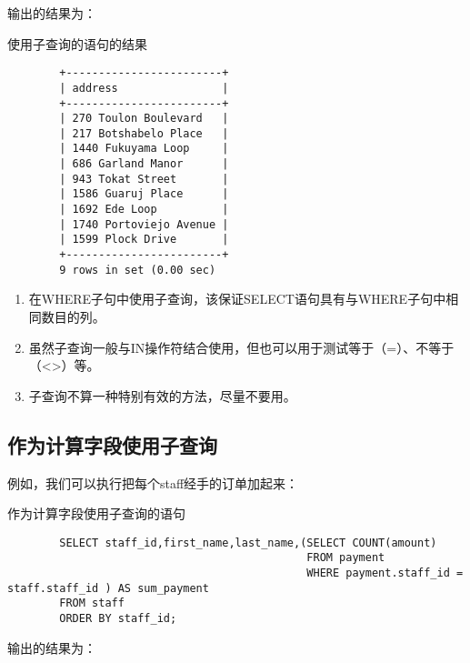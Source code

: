 \documentclass[UTF8]{article}
\begin{document}
输出的结果为：

\begin{listing}[H]
	\caption{使用子查询的语句的结果}
	\label{code:usesubqueryclauseresult}
\begin{verbatim}
        +------------------------+
        | address                |
        +------------------------+
        | 270 Toulon Boulevard   |
        | 217 Botshabelo Place   |
        | 1440 Fukuyama Loop     |
        | 686 Garland Manor      |
        | 943 Tokat Street       |
        | 1586 Guaruj Place      |
        | 1692 Ede Loop          |
        | 1740 Portoviejo Avenue |
        | 1599 Plock Drive       |
        +------------------------+
        9 rows in set (0.00 sec)
\end{verbatim}
\end{listing}

\begin{orangebox}[frametitle={Tips 14.1.1 子查询注意事项}]
        \begin{enumerate}
                \item 在WHERE子句中使用子查询，该保证SELECT语句具有与WHERE子句中相同数目的列。
                \item 虽然子查询一般与IN操作符结合使用，但也可以用于测试等于（=）、不等于（<>）等。
                \item 子查询不算一种特别有效的方法，尽量不要用。
        \end{enumerate}    
\end{orangebox}

\subsection{作为计算字段使用子查询}

例如，我们可以执行把每个staff经手的订单加起来：

\begin{listing}[H]
	\caption{作为计算字段使用子查询的语句}
	\label{code:asculculationusesubqueryclause}
\begin{verbatim}
        SELECT staff_id,first_name,last_name,(SELECT COUNT(amount) 
                                              FROM payment 
                                              WHERE payment.staff_id = staff.staff_id ) AS sum_payment 
        FROM staff 
        ORDER BY staff_id;
\end{verbatim}
\end{listing}

输出的结果为：
\end{document}
